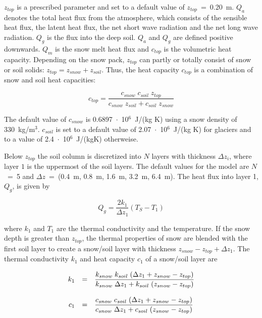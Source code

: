 $z_{top}$ is a prescribed parameter and set to a default
value of $z_{top}$~=~0.20~m.
$Q_a$ denotes the total heat flux from the atmosphere,
which consists of the sensible heat flux,
the latent heat flux, the net short wave radiation and the
net long wave radiation. $Q_g$ is the flux
into the deep soil. $Q_a$ and $Q_g$ are defined positive
downwards. $Q_m$ is the
snow melt heat flux and $c_{top}$  is the
volumetric heat capacity. Depending on the snow
pack, $z_{top}$ can partly or totally consist
of snow or soil solids:
$z_{top}=z_{snow}+z_{soil}$.  Thus, the heat
capacity $c_{top}$ is a
combination of snow and soil heat capacities:

\begin{equation}
c_{top} =\frac{ c_{snow} \; c_{soil} \; z_{top}}{c_{snow} \; z_{soil} +
c_{soil} \; z_{snow}}
\end{equation}

The default value of
$c_{snow}$ is
0.6897~$\cdot$~10$^{6}$~J/(kg K) using a snow
density
of 330~kg/m$^3$. $c_{soil}$ is set to a default value
of 2.07~$\cdot$~10$^{6}$~J/(kg K) for
glaciers and to a value of 2.4~$\cdot$~10$^{6}$~J/(kgK) otherweise.

Below $z_{top}$ the soil column is discretized into
$N$ layers with thickness $\Delta z_i$,
where layer $1$ is the uppermost of the soil
layers. The default values for the model are $N$~=~5
and $\Delta z$~=~(0.4~m, 0.8~m, 1.6~m, 
3.2~m, 6.4~m). The heat flux into layer 1, $Q_g$, is
given by

\begin{equation}
Q_g=\frac{2 k_{1}}{\Delta z_{1}} (T_S - T_{1})
\end{equation}
 
where $k_{1}$ and $T_{1}$ are the thermal
conductivity and the temperature.
If the snow depth is greater than $z_{top}$, the
thermal properties of snow are blended with the
first soil layer to create a snow/soil layer with
thickness $z_{snow}-z_{top}+\Delta z_1$. The
thermal conductivity $k_1$ and heat capacity
$c_1$ of a snow/soil layer are

\begin{equation}
\begin{array}{rcl}
\displaystyle k_1 & = & \displaystyle \frac{k_{snow}\; k_{soil}\; (\Delta
z_1+z_{snow}-z_{top})}{k_{snow}\; \Delta z_1 +
k_{soil}\; (z_{snow}-z_{top})} \\
&&\\
\displaystyle c_1 & = & \displaystyle \frac{c_{snow}\; c_{soil}\; (\Delta
z_1+z_{snow}-z_{top})}{c_{snow}\; \Delta z_1 +
c_{soil}\; (z_{snow}-z_{top})}
\end{array}
\end{equation}


